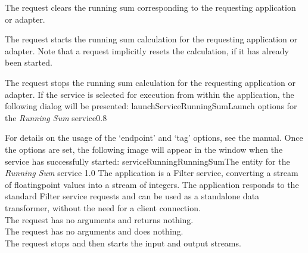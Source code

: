 The  request clears the running sum
corresponding to the requesting application or adapter.\\
%

The  request starts the running sum
calculation for the requesting application or adapter.
Note that a  request implicitly resets the
calculation, if it has already been started.\\
%

The  request stops the running sum
calculation for the requesting application or adapter.
%
\condPage{}
If the service is selected for execution from within the \emph{\MMMU} application, the
following dialog will be presented:
%
{launchServiceRunningSum}{Launch options for the \emph{Running Sum} service}{0.8}

For details on the usage of the `endpoint' and `tag' options, see the \emph{\MMMU} manual.
Once the options are set, the following image will appear in the \emph{\MMMU} window when
the service has successfully started:
%
{serviceRunningRunningSum}{The \emph{\MMMU} entity for the \emph{Running Sum} service}%
{1.0}
The  application is a Filter
service, converting a stream of floating\longDash{}point values into a stream of integers.
The application responds to the standard Filter service requests and can be used as a
standalone data transformer, without the need for a client connection.\\

The  request has no arguments and
returns nothing.\\

The  request has no arguments and
does nothing.\\

The  request stops and then
starts the input and output streams.\\

